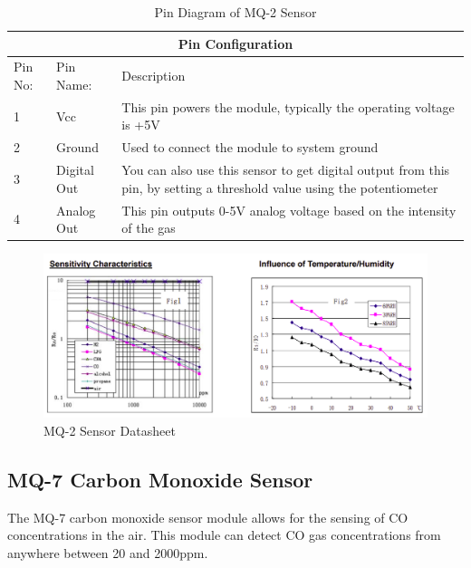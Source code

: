 \begin{table}[!ht]
\centering
\begin{tabular}{ |p{1cm}|p{2cm}|p{8cm}|  }
\hline
\multicolumn{3}{|c|}{Pin Configuration} \\
\hline
Pin No: & Pin Name: & Description \\
\hline
1 & Vcc  & This pin powers the module, typically the operating voltage is +5V\\
2 & Ground & Used to connect the module to system ground\\
3 & Digital Out & You can also use this sensor to get digital output from this pin, by setting a threshold value using the potentiometer\\
4 & Analog Out & This pin outputs 0-5V analog voltage based on the intensity of the gas \\
\hline
\end{tabular}
\caption{\label{mq-2pin}Pin Diagram of MQ-2 Sensor}
\end{table}


\begin{figure}[!ht]
\centering
\includegraphics[width=\linewidth]{figures/mq2-datasheet.png}
\caption{\label{img38} MQ-2 Sensor Datasheet}
\end{figure}

\subsection{MQ-7 Carbon Monoxide Sensor}

The MQ-7 carbon monoxide sensor module allows for the sensing of CO concentrations in the air. This module can detect CO gas concentrations from anywhere between 20 and 2000ppm.

